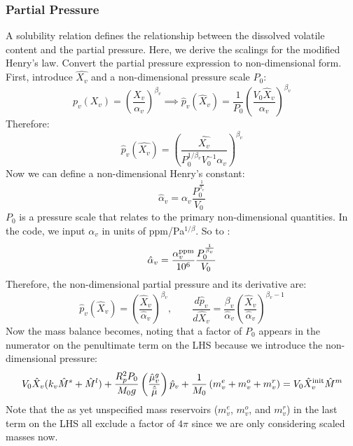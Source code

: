 \subsubsection{Partial Pressure}
A solubility relation defines the relationship between the dissolved volatile content and the partial pressure.  Here, we derive the scalings for the modified Henry's law.
Convert the partial pressure expression to non-dimensional form.  First, introduce $\hat{X_v}$ and a non-dimensional pressure scale $P_0$:
\begin{equation}
p_v( X_v ) = \left( \frac{X_v}{\alpha_v} \right)^{\beta_v} \implies
 \hat{p}_v( \hat{X}_v ) = \frac{1}{P_0} \left( \frac{V_0 \hat{X}_v}{\alpha_v} \right)^{\beta_v}
 \end{equation}
Therefore:
\begin{equation}
\hat{p}_v ( \hat{X_v} ) = \left( \frac{\hat{X_v}}{P_0^{1/\beta_v} V_0^{-1} \alpha_v} \right)^{\beta_v}
\end{equation}
Now we can define a non-dimensional Henry's constant:
\begin{equation}
\hat{\alpha}_v = \alpha_v \frac{P_0^\frac{1}{\beta_v}}{V_0}
\end{equation}
$P_0$ is a pressure scale that relates to the primary non-dimensional quantities.  In the code, we input $\alpha_v$ in units of ppm/Pa$^{1/\beta}$.  So to :
\begin{equation}
\hat{\alpha}_v = \frac{\alpha_v^{\rm ppm}}{10^6} \frac{P_0^\frac{1}{\beta_v}}{V_0}
\end{equation}
Therefore, the non-dimensional partial pressure and its derivative are:
\begin{equation}
\hat{p}_v ( \hat{X}_v ) = \left( \frac{\hat{X}_v}{\hat{\alpha}_v} \right) ^ {\beta_v}, \qquad \frac{d \hat{p}_v}{d \hat{X}_v} = \frac{\beta_v}{\hat{\alpha}_v} \left( \frac{\hat{X}_v}{\hat{\alpha}_v} \right)^{\beta_v-1}
\end{equation}
Now the mass balance becomes, noting that a factor of $P_0$ appears in the numerator on the penultimate term on the LHS because we introduce the non-dimensional pressure:
\begin{equation}
V_0 \hat{X}_v (k_v \hat{M}^s + \hat{M}^l) + \frac{R_p^2 P_0}{M_0 g} \left( \frac{\hat{\mu}_v^g}{\hat{\bar{\mu}}} \right) \hat{p}_v + \frac{1}{M_0} \left( m_v^e + m_v^o + m_v^r \right) = V_0 \hat{X}_v^{\rm init} \hat{M}^m
\end{equation}
Note that the as yet unspecified mass reservoirs ($m_v^e$, $m_v^o$, and $m_v^r$) in the last term on the LHS all exclude a factor of $4\pi$ since we are only considering scaled masses now.
